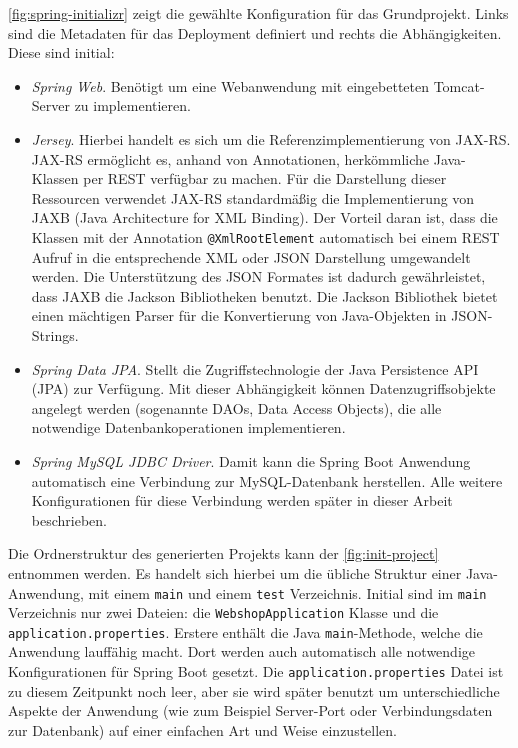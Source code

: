 \cref{fig:spring-initializr} zeigt die gewählte Konfiguration für das Grundprojekt. Links sind die Metadaten für das Deployment definiert und rechts die Abhängigkeiten. Diese sind initial:
\begin{itemize}
	\item \textit{Spring Web}. Benötigt um eine Webanwendung mit eingebetteten Tomcat-Server zu implementieren.
	\item \textit{Jersey}. Hierbei handelt es sich um die Referenzimplementierung von JAX-RS. JAX-RS ermöglicht es, anhand von Annotationen, herkömmliche Java-Klassen per REST verfügbar zu machen. Für die Darstellung dieser Ressourcen verwendet JAX-RS standardmäßig die Implementierung von \acs{JAXB} (Java Architecture for XML Binding). Der Vorteil daran ist, dass die Klassen mit der Annotation \texttt{@XmlRootElement} automatisch bei einem REST Aufruf in die entsprechende XML oder \acs{JSON} Darstellung umgewandelt werden. Die Unterstützung des JSON Formates ist dadurch gewährleistet, dass JAXB die Jackson Bibliotheken benutzt. Die Jackson Bibliothek bietet einen mächtigen Parser für die Konvertierung von Java-Objekten in JSON-Strings\cite{Oracle2015}.
	\item \textit{Spring Data JPA}. Stellt die Zugriffstechnologie der Java Persistence API (\acs{JPA}) zur Verfügung. Mit dieser Abhängigkeit können Datenzugriffsobjekte angelegt werden (sogenannte \acs{DAO}s, Data Access Objects), die alle notwendige Datenbankoperationen implementieren\cite{Webb2017}. 
	\item \textit{Spring MySQL JDBC Driver}. Damit kann die Spring Boot Anwendung automatisch eine Verbindung zur MySQL-Datenbank herstellen\cite{Webb2017}. Alle weitere Konfigurationen für diese Verbindung werden später in dieser Arbeit beschrieben.
\end{itemize}

Die Ordnerstruktur des generierten Projekts kann der \cref{fig:init-project} entnommen werden. Es handelt sich hierbei um die übliche Struktur einer Java-Anwendung, mit einem \texttt{main} und einem \texttt{test} Verzeichnis. Initial sind im \texttt{main} Verzeichnis nur zwei Dateien: die \texttt{WebshopApplication} Klasse und die \texttt{application.properties}. Erstere enthält die Java \texttt{main}-Methode, welche die Anwendung lauffähig macht. Dort werden auch automatisch alle notwendige Konfigurationen für Spring Boot gesetzt. Die \texttt{application.properties} Datei ist zu diesem Zeitpunkt noch leer, aber sie wird später benutzt um unterschiedliche Aspekte der Anwendung (wie zum Beispiel Server-Port oder Verbindungsdaten zur Datenbank) auf einer einfachen Art und Weise einzustellen.

